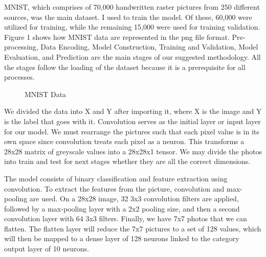 \documentclass[letterpaper, 10 pt, conference]{ieeeconf}  %
\begin{document}
MNIST, which comprises of 70,000 handwritten raster pictures from 250 different sources, was the main dataset. I used to train the model. Of these, 60,000 were utilized for training, while the remaining 15,000 were used for training validation. Figure 1 shows how MNIST data are represented in the png file format. Pre-processing, Data Encoding, Model Construction, Training and Validation, Model Evaluation, and Prediction are the main stages of our suggested methodology. All the stages follow the loading of the dataset because it is a prerequisite for all processes. \par

\begin{figure}[thpb]
      \centering
      \caption{MNIST Data}
      \label{fig:1}
\end{figure}

We divided the data into X and Y after importing it, where X is the image and Y is the label that goes with it. Convolution serves as the initial layer or input layer for our model. We must rearrange the pictures such that each pixel value is in its own space since convolution treats each pixel as a neuron. This transforms a 28x28 matrix of greyscale values into a 28x28x1 tensor. We may divide the photos into train and test for next stages whether they are all the correct dimensions. \par

The model consists of binary classification and feature extraction using convolution. To extract the features from the picture, convolution and max-pooling are used. On a 28x28 image, 32 3x3 convolution filters are applied, followed by a max-pooling layer with a 2x2 pooling size, and then a second convolution layer with 64 3x3 filters. Finally, we have 7x7 photos that we can flatten. The flatten layer will reduce the 7x7 pictures to a set of 128 values, which will then be mapped to a dense layer of 128 neurons linked to the category output layer of 10 neurons. \par
\end{document}
